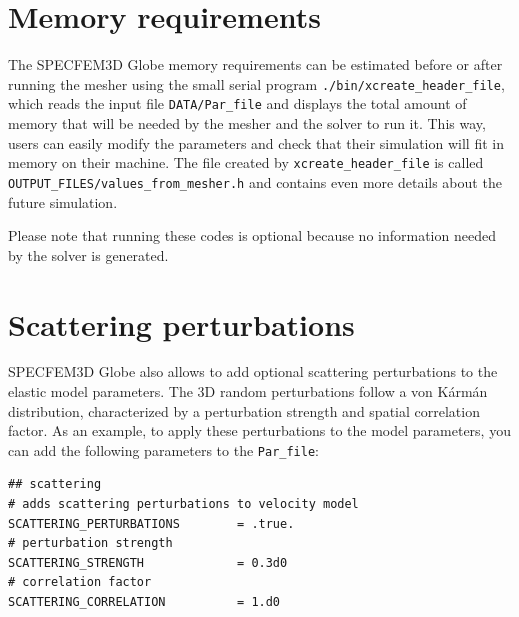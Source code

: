 \section{Memory requirements}

The SPECFEM3D Globe memory requirements can be estimated before or
after running the mesher using the small serial program \texttt{\small ./bin/xcreate\_header\_file},
which reads the input file \texttt{\small DATA/Par\_file} and displays
the total amount of memory that will be needed by the mesher and the
solver to run it. This way, users can easily modify the parameters
and check that their simulation will fit in memory on their machine.
The file created by \texttt{\small xcreate\_header\_file} is called
\texttt{OUTPUT\_FILES/values\_from\_mesher.h} and contains even more
details about the future simulation.



Please note that running these codes is optional because no information
needed by the solver is generated.


\section{Scattering perturbations}\label{sec:Scattering-perturbations}

SPECFEM3D Globe also allows to add optional scattering perturbations to the elastic model parameters.
The 3D random perturbations follow a von K\'arm\'an distribution, characterized by a perturbation strength and spatial correlation factor.
As an example, to apply these perturbations to the model parameters, you can add the following parameters to the \texttt{Par\_file}:
{\small
\begin{verbatim}
## scattering
# adds scattering perturbations to velocity model
SCATTERING_PERTURBATIONS        = .true.
# perturbation strength
SCATTERING_STRENGTH             = 0.3d0
# correlation factor
SCATTERING_CORRELATION          = 1.d0
\end{verbatim}
}

